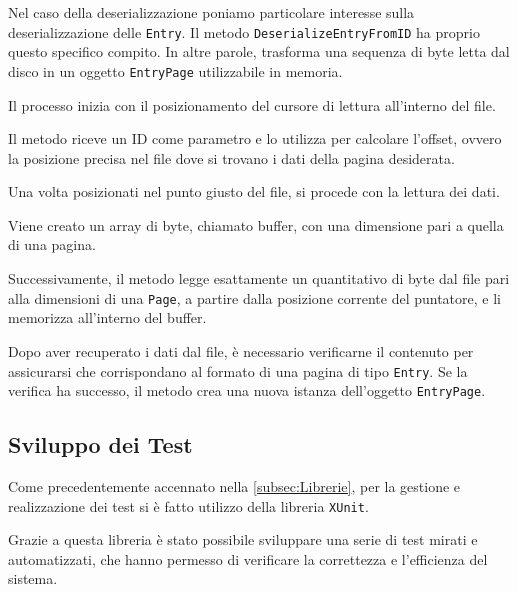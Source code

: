 \documentclass[12pt,a4paper,openright,twoside]{book}
\begin{document}
                    

                    \clearpage

                    Nel caso della deserializzazione poniamo particolare interesse sulla deserializzazione delle \texttt{Entry}. Il metodo \texttt{DeserializeEntryFromID} ha proprio questo specifico compito. In altre parole, trasforma una sequenza di byte letta dal disco in un oggetto \texttt{EntryPage} utilizzabile in memoria.

                    Il processo inizia con il posizionamento del cursore di lettura all'interno del file.

                    Il metodo riceve un ID come parametro e lo utilizza per calcolare l'offset, ovvero la posizione precisa nel file dove si trovano i dati della pagina desiderata.

                    Una volta posizionati nel punto giusto del file, si procede con la lettura dei dati.

                    Viene creato un array di byte, chiamato buffer, con una dimensione pari a quella di una pagina.

                    Successivamente, il metodo legge esattamente un quantitativo di byte dal file pari alla dimensioni di una \texttt{Page}, a partire dalla posizione corrente del puntatore, e li memorizza all'interno del buffer.

                    Dopo aver recuperato i dati dal file, è necessario verificarne il contenuto per assicurarsi che corrispondano al formato di una pagina di tipo \texttt{Entry}. Se la verifica ha successo, il metodo crea una nuova istanza dell'oggetto \texttt{EntryPage}.

                    

        \pagebreak

        \subsection{Sviluppo dei Test}

            Come precedentemente accennato nella \cref{subsec:Librerie}, per la gestione e realizzazione dei test si è fatto utilizzo della libreria \texttt{XUnit}.

            Grazie a questa libreria è stato possibile sviluppare una serie di test mirati e automatizzati, che hanno permesso di verificare la correttezza e l'efficienza del sistema.
\end{document}
